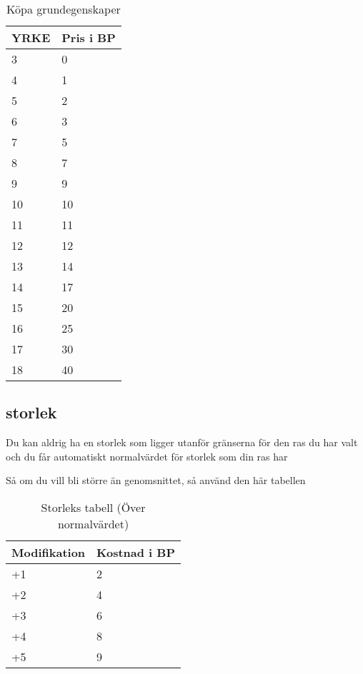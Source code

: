 \documentclass[a4paper, 10pt, titlepage]{article}
\begin{document}
\begin{table}[hbp]
  \caption{Köpa grundegenskaper}
  \begin{tabular}{|l|l|}
    \hline
    YRKE & Pris i BP \\
    \hline
    3    & 0 \\
    \hline
    4    & 1 \\
    \hline
    5    & 2 \\
    \hline
    6    & 3 \\
    \hline
    7    & 5 \\
    \hline
    8    & 7 \\
    \hline
    9    & 9 \\
    \hline
    10   & 10 \\
    \hline
    11   & 11 \\
    \hline
    12   & 12 \\
    \hline
    13   & 14 \\
    \hline
    14   & 17 \\
    \hline
    15   & 20 \\
    \hline
    16   & 25 \\
    \hline
    17   & 30 \\
    \hline
    18   & 40 \\
    \hline
  \end{tabular}
\end{table}

\subsection{storlek}
Du kan aldrig ha en storlek som ligger utanför gränserna för den ras du har valt och
du får automatiskt normalvärdet för storlek som din ras har

Så om du vill bli större än genomsnittet, så använd den här tabellen
\begin{table}[hbp]
  \caption{Storleks tabell (Över normalvärdet)}
  \begin{tabular}{|l|l|}
    \hline
    Modifikation & Kostnad i BP \\
    \hline
    +1           & 2            \\
    \hline
    +2           & 4            \\
    \hline
    +3           & 6            \\
    \hline
    +4           & 8            \\
    \hline
    +5           & 9            \\
    \hline
  \end{tabular}
\end{table}
\end{document}
